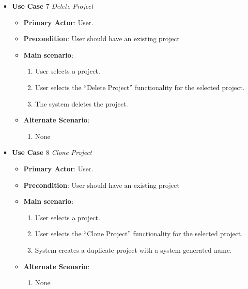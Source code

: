 \documentclass{report}
\begin{document}
\begin{tcolorbox}[colframe=white, colback=lightgreen, arc=8pt]
\begin{itemize}
    \item \textbf{Use Case $7$} \textit{Delete Project
}\\
    \begin{itemize}
        \item \textbf{Primary Actor}: User.
        \item \textbf{Precondition}: User should have an existing project
        \item \textbf{Main scenario}: \begin{enumerate}
            \item User selects a project. 
            \item User selects the “Delete Project” functionality for the selected project.
            \item The system deletes the project.
        \end{enumerate}
       \item \textbf{Alternate Scenario}: 
       \begin{enumerate}
           \item 
           None
       \end{enumerate}
    \end{itemize}
\end{itemize}
\end{tcolorbox}

\begin{tcolorbox}[colframe=white, colback=lightgreen, arc=8pt]
\begin{itemize}
    \item \textbf{Use Case $8$} \textit{Clone Project
}\\
    \begin{itemize}
        \item \textbf{Primary Actor}: User.
        \item \textbf{Precondition}: User should have an existing project
        \item \textbf{Main scenario}: \begin{enumerate}
            \item User selects a project. 
            \item User selects the “Clone Project” functionality for the selected project.
            \item System creates a duplicate project with a system generated name.
        \end{enumerate}
       \item \textbf{Alternate Scenario}: 
       \begin{enumerate}
           \item 
           None
       \end{enumerate}
    \end{itemize}
\end{itemize}
\end{tcolorbox}
\end{document}

